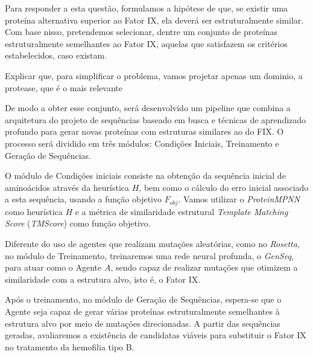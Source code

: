 Para responder a esta questão, formulamos a hipótese de que, 
se existir uma proteína alternativa superior ao Fator IX, 
ela deverá ser estruturalmente similar. 
Com base nisso, pretendemos selecionar, dentre um conjunto de proteínas estruturalmente semelhantes ao Fator IX,
aquelas que satisfazem os critérios estabelecidos, caso existam.

{\color{red} Explicar que, para simplificar o problema, vamos projetar apenas um dominio, a protease, que é o mais relevante}

De modo a obter esse conjunto,
será desenvolvido um pipeline que combina a arquitetura do projeto de sequências baseado em busca e técnicas de aprendizado profundo
para gerar novas proteínas com estruturas similares ao do FIX.
O processo será dividido em três módulos: Condições Iniciais, Treinamento e Geração de Sequências. 

O módulo de Condições iniciais consiste na obtenção da sequência inicial de aminoácidos através da heurística $H$,
bem como o cálculo do erro inicial associado a esta sequência, usando a função objetivo $F_{obj}$. 
Vamos utilizar o \textit{ProteinMPNN} como heurística $H$ e a métrica de similaridade estrutural 
\textit{Template Matching Score} (\textit{TMScore}) como função objetivo.

Diferente do uso de agentes que realizam mutações aleatórias, como no \textit{Rosetta},
no módulo de Treinamento, treinaremos uma rede neural profunda, o \textit{GenSeq}, para atuar como o Agente $A$,
sendo capaz de realizar mutações que otimizem a similaridade com a estrutura alvo, isto é, o Fator IX.

Após o treinamento, no módulo de Geração de Sequências, 
espera-se que o Agente seja capaz de gerar várias proteínas estruturalmente semelhantes à estrutura alvo por meio de mutações direcionadas. 
A partir das sequências geradas, avaliaremos a existência de candidatas viáveis para substituir o Fator IX no tratamento da hemofilia tipo B.



